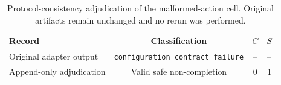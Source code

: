 \begin{table}[t]
\caption{Protocol-consistency adjudication of the malformed-action cell. Original artifacts remain unchanged and no rerun was performed.}
\label{tab:v02-adjudication}
\centering
\small
\setlength{\tabcolsep}{4pt}
\begin{tabular}{lccc}
\toprule
Record & Classification & $C$ & $S$ \\
\midrule
Original adapter output & \texttt{configuration\_contract\_failure} & -- & -- \\
Append-only adjudication & Valid safe non-completion & 0 & 1 \\
\bottomrule
\end{tabular}
\end{table}

